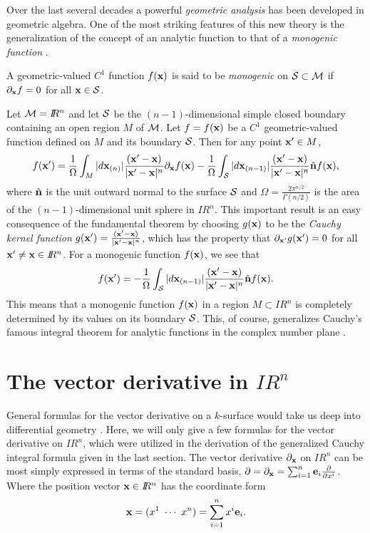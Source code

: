 \documentclass[12]{article}
\def\no{\noindent}
\def\bx{{\bf x}}
\def\bn{{\bf n}}
\def\be{{\bf e}}
\def\R{I\!\!R}
\def\no{\noindent}
\def\no{\noindent}
\def\no{\noindent}
\def\d{\partial}
\begin{document}
Over the last several decades a powerful {\it geometric analysis} has been developed in
geometric algebra. One of the most striking features of this new theory is the generalization of
the concept of an analytic function to that of a {\it monogenic function} \cite{ca}. 

\bigskip

\no {\bf Definition:} A geometric-valued $C^1$ function $f(\bx)$ 
is said to be {\it monogenic} on ${\cal S}\subset {\cal M}$ if $\d_\bx f=0$ for
all $\bx \in {\cal S}$.

\bigskip

Let ${\cal M}=\R^n$ and let $\cal S$ be the $(n-1)$-dimensional simple closed boundary containing
an open region $M$ of $\cal M$. Let $f=f(\bx)$ be a $C^1$ geometric-valued function defined on $M$
and its boundary ${\cal S}$. Then for any point $\bx^\prime \in M$, 
  \[  f(\bx^\prime) = \frac{1}{\Omega} \int_M |d\bx_{(n)}|\frac{(\bx^\prime-\bx)}{|\bx^\prime
  -\bx|^n}\partial_{\bx}f(\bx)
          -\frac{1}{\Omega} \int_{\cal S} |d\bx_{(n-1)}|\frac{(\bx^\prime-\bx)}{|\bx^\prime-\bx|^n}\hat \bn f(\bx), \]
 where $\hat \bn$ is the unit outward normal to the surface ${\cal S}$ and $\Omega = \frac{2 \pi^{n/2}}
 {\Gamma(n/2)}$ is the area of the $(n-1)$-dimensional unit sphere in $\R^n$. This important result
 is an easy consequence of the fundamental theorem by choosing $g(\bx)$ to be the {\it Cauchy kernel function}
 $g(\bx^\prime)=  \frac{(\bx^\prime-\bx)}{|\bx^\prime -\bx|^n} $, 
 which has the property that $\partial_{\bx^\prime}g(\bx^\prime)=0$ for all $\bx^\prime \ne \bx \in \R^n$.
 For a monogenic function $f(\bx)$, we see that     
   \[  f(\bx^\prime) = -\frac{1}{\Omega} \int_{\cal S} |d\bx_{(n-1)}|\frac{(\bx^\prime-\bx)}{|\bx^\prime-\bx|^n}\hat \bn f(\bx). \]
   This means that a monogenic function $f(\bx)$ in a region $M\subset \R^n$ 
   is completely determined by its values on its boundary $\cal S$. This, of course, generalizes
   Cauchy's famous integral theorem for analytic functions in the complex number plane \cite{A79}.
   
 \section*{The vector derivative in $\R^n$}
 
   General formulas for the vector derivative on a $k$-surface would take us deep into differential geometry
   \cite{H/S}. Here, we will only give a few formulas for the vector derivative on $\R^n$, which were utilized in
   the derivation of the generalized Cauchy integral formula given in the last section. The vector
   derivative $\partial_\bx$ on $\R^n$ can be most simply expressed in terms of the standard basis,
   $\partial=\partial_\bx = \sum_{i=1}^n \be_i \frac{\partial}{\partial x^i}$. Where the position vector $\bx\in \R^n$
   has the coordinate form 
     \[ \bx=(x^1 \ \cdots \  x^n )= \sum_{i=1}^n x^i \be_i . \] 
   
\end{document}
